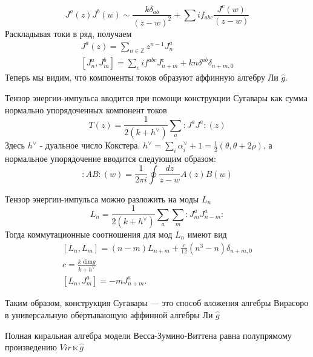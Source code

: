 \begin{equation}
  \label{eq:89}
  J^a(z) J^b(w) \sim \frac{k\delta_{ab}}{(z-w)^2}+\sum i f_{abc}\frac{J^c(w)}{(z-w)}
\end{equation}
Раскладывая токи в ряд, получаем
\begin{equation}
  \label{eq:90}
  \begin{aligned}
    J^a(z)=\sum_{n\in \mathbb Z}z^{n-1}J^a_n\\
    \left[J^a_n,J^b_m\right]=\sum_c i f^{abc}J^c_{n+m}+kn\delta^{ab}\delta_{n+m,0}
  \end{aligned}
\end{equation}
Теперь мы видим, что компоненты токов образуют аффинную алгебру Ли $\hat g$.


Тензор энергии-импульса вводится при помощи конструкции Сугавары как сумма нормально упорядоченных компонент токов
\begin{equation}
  \label{eq:102}
  T(z)=\frac{1}{2(k+h^{\vee})}\sum_a :J^a J^a:(z)
\end{equation}
Здесь $h^{\vee}$ - дуальное число Кокстера. $h^{\vee}=\sum_i \alpha_i^{\vee} +1=\frac{1}{2}(\theta,\theta+2\rho)$,
а нормальное упорядочение вводится следующим образом: 
\begin{equation}
  \label{eq:12}
  :AB:(w)=\frac{1}{2\pi i}\oint\frac{dz}{z-w}A(z)B(w)
\end{equation}

Тензор энергии-импульса можно разложить на моды $L_n$
\begin{equation}
  \label{eq:91}
  L_n=\frac{1}{2(k+h^{\vee})}\sum_a\sum_m:J^a_m J^a_{n-m}:
\end{equation}
Тогда коммутационные соотношения для мод $L_n$ имеют вид
\begin{equation}
  \label{eq:92}
  \begin{aligned}
    \left[L_n,L_m\right]=(n-m)L_{n+m}+\frac{c}{12}(n^3-n)\delta_{n+m,0}\\
    c=\frac{k\;\mathrm{dim}g}{k+h^{\vee}}\\
    \left[L_n,J^a_m\right]=-mJ^a_{n+m}.
  \end{aligned}
\end{equation}

Таким образом, конструкция Сугавары --- это способ вложения алгебры Вирасоро в универсальную обертывающую аффинной алгебры Ли $\hat{g}$

Полная киральная алгебра модели Весса-Зумино-Виттена равна полупрямому произведению $Vir\ltimes \hat g$

